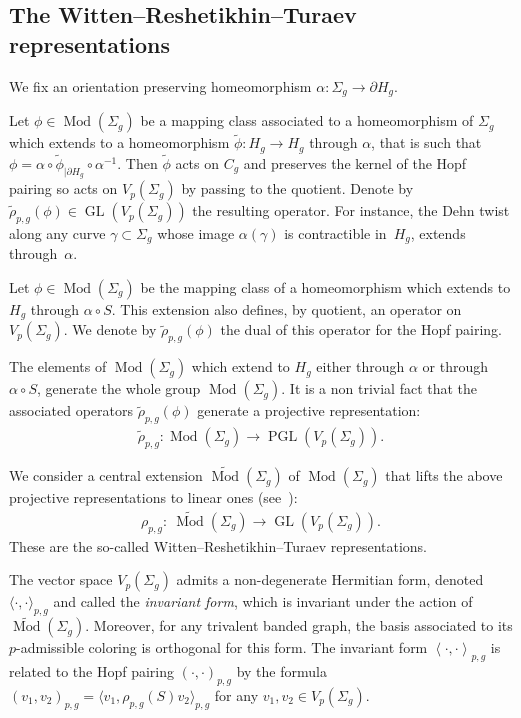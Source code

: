 \documentclass[11pt]{article}
\newcommand{\GL}{\operatorname{GL}}
\newcommand{\PGL}{\operatorname{PGL}}
\newcommand{\Mod}{\operatorname{Mod}}
\newcommand{\mcg}{\Mod(\Sigma_g)}
\newcommand{\emcg}{\widetilde{\Mod}(\Sigma_g)}
\numberwithin{equation}{section}
\begin{document}
\subsection{The Witten--Reshetikhin--Turaev representations}\label{section2.2}

We fix an orientation preserving homeomorphism $\alpha\colon \Sigma_g \rightarrow \partial H_g$.

Let $\phi \in \mcg$ be a mapping class associated to a homeomorphism of $\Sigma_g$ which extends to a homeomorphism $\widetilde{\phi}\colon H_g\rightarrow H_g$ through $\alpha$, that is such that $\phi=\alpha\circ \widetilde{\phi}_{| \partial H_g}\circ \alpha^{-1}$. Then $\widetilde{\phi}$ acts on $C_g$ and preserves the kernel of the Hopf pairing so acts on $V_{p}(\Sigma_g)$ by passing to the quotient. Denote by $\tilde{\rho}_{p,g}(\phi) \in \GL(V_{p}(\Sigma_g))$ the resulting operator. For instance, the Dehn twist along any curve $\gamma\subset \Sigma_g$ whose image $\alpha(\gamma)$ is contractible in~$H_g$, extends through~$\alpha$.

Let $\phi\in \mcg$ be the mapping class of a homeomorphism which extends to $H_g$ through $\alpha\circ S$. This extension also defines, by quotient, an operator on $V_{p}(\Sigma_g)$. We denote by $\tilde{\rho}_{p,g}(\phi)$ the dual of this operator for the Hopf pairing.

The elements of $\mcg$ which extend to $H_g$ either through $\alpha$ or through $\alpha\circ S$, generate the whole group $\mcg$. It is a non trivial fact that the associated operators $\tilde{\rho}_{p,g}(\phi)$ generate a projective representation:
\begin{gather*} \tilde{\rho}_{p,g} \colon \mcg \rightarrow \PGL(V_{p}(\Sigma_g)).\end{gather*}

We consider a central extension $\emcg$ of $\mcg$ that lifts the above projective representations to linear ones (see~\cite{GM13, MR}):
\begin{gather*} \rho_{p,g} \colon \ \emcg \rightarrow \GL(V_{p}(\Sigma_g)).\end{gather*}
These are the so-called Witten--Reshetikhin--Turaev representations.

The vector space $V_p(\Sigma_g)$ admits a non-degenerate Hermitian form, denoted $\langle \cdot, \cdot\rangle_{p,g}$ and called the \textit{invariant form}, which is invariant under the action of~$\emcg$. Moreover, for any trivalent banded graph, the basis associated to its $p$-admissible coloring is orthogonal for this form. The invariant form $\left<\cdot, \cdot\right>_{p,g}$ is related to the Hopf pairing $ (\cdot, \cdot )_{p,g}$ by the formula $ (v_1, v_2 )_{p,g}= \langle v_1, \rho_{p,g}(S)v_2\rangle _{p,g}$ for any $v_1,v_2\in V_p(\Sigma_g)$.
\end{document}

